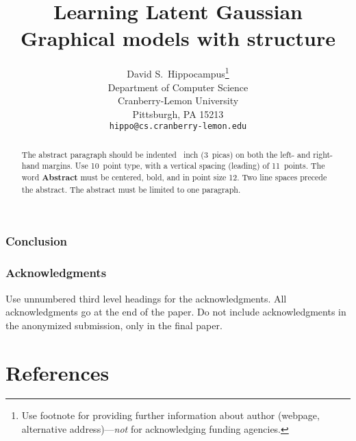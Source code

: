\documentclass{article}
\title{Learning Latent Gaussian Graphical models with structure}
\author{
  David S.~Hippocampus\thanks{Use footnote for providing further
    information about author (webpage, alternative
    address)---\emph{not} for acknowledging funding agencies.} \\
  Department of Computer Science\\
  Cranberry-Lemon University\\
  Pittsburgh, PA 15213 \\
  \texttt{hippo@cs.cranberry-lemon.edu} \\
}
\begin{document}

\maketitle

\begin{abstract}
  The abstract paragraph should be indented ~inch
  (3~picas) on both the left- and right-hand margins. Use 10~point
  type, with a vertical spacing (leading) of 11~points.  The word
  \textbf{Abstract} must be centered, bold, and in point size 12. Two
  line spaces precede the abstract. The abstract must be limited to
  one paragraph.
\end{abstract}













\subsubsection{Conclusion}

\subsubsection*{Acknowledgments}

Use unnumbered third level headings for the acknowledgments. All
acknowledgments go at the end of the paper. Do not include
acknowledgments in the anonymized submission, only in the final paper.

\section*{References}
\end{document}
